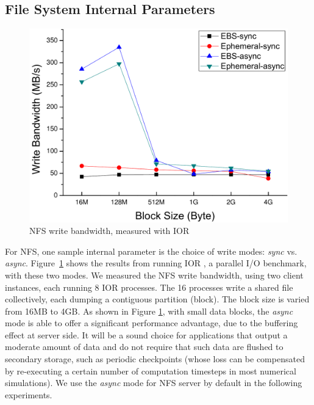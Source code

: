     \subsection{File System Internal Parameters}
    \begin{figure}[htpb]
        \centering
        \includegraphics[width=0.8\linewidth]{../figures/nfs-write}
        \caption{NFS write bandwidth, measured with IOR}
        \label{fig:nfs}
    \end{figure}
    For NFS, one sample internal parameter is the choice of write modes:
    \textit{sync} vs. \textit{async}.  Figure~\ref{fig:nfs} shows the results
    from running IOR \cite{bib:ior}, a parallel I/O benchmark, with these
    two modes. We measured the NFS write bandwidth, using two client
    instances, each running 8 IOR processes. The 16 processes write a shared
    file collectively, each dumping a contiguous partition (block).  The block
    size is varied from 16MB to 4GB. As shown in Figure \ref{fig:nfs}, with
    small data blocks, the \textit{async} mode is able to offer a significant
    performance advantage, due to the buffering effect at server side. It will
    be a sound choice for applications that output a moderate amount of data
    and do not require that such data are flushed to secondary storage, such
    as periodic checkpoints (whose loss can be compensated by re-executing a
    certain number of computation timesteps in most numerical simulations). We
    use the \textit{async} mode for NFS server by default in the following
    experiments. 
